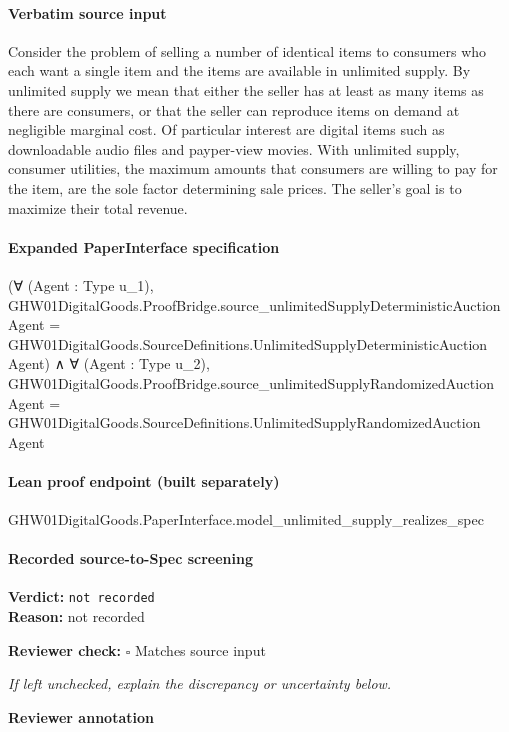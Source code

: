 \documentclass[10pt]{article}
\newcommand{\reviewerbox}{%
  \par\noindent\fbox{\parbox{0.96\linewidth}{\rule{0pt}{0.38in}}}\par
}
\newcommand{\reviewmatch}[1]{%
  \par\noindent\textbf{Reviewer check:} $\square$\; #1\par
  \noindent\emph{If left unchecked, explain the discrepancy or uncertainty below.}\par
}
\begin{document}
\paragraph{Verbatim source input}
\begin{ReviewVerbatim}
Consider the problem of selling a number of identical
items to consumers who each want a single item and
the items are available in unlimited supply. By unlimited supply we mean that either the seller has at
least as many items as there are consumers, or that
the seller can reproduce items on demand at negligible marginal cost. Of particular interest are digital items such as downloadable audio files and payper-view movies. With unlimited supply, consumer
utilities, the maximum amounts that consumers are
willing to pay for the item, are the sole factor determining sale prices. The seller’s goal is to maximize
their total revenue.
\end{ReviewVerbatim}


\paragraph{Expanded PaperInterface specification}
\begin{ReviewVerbatim}
(∀ (Agent : Type u_1),
    GHW01DigitalGoods.ProofBridge.source_unlimitedSupplyDeterministicAuction Agent =
      GHW01DigitalGoods.SourceDefinitions.UnlimitedSupplyDeterministicAuction Agent) ∧
  ∀ (Agent : Type u_2),
    GHW01DigitalGoods.ProofBridge.source_unlimitedSupplyRandomizedAuction Agent =
      GHW01DigitalGoods.SourceDefinitions.UnlimitedSupplyRandomizedAuction Agent
\end{ReviewVerbatim}

\paragraph{Lean proof endpoint (built separately)}\begin{ReviewVerbatim}
GHW01DigitalGoods.PaperInterface.model_unlimited_supply_realizes_spec
\end{ReviewVerbatim}

\paragraph{Recorded source-to-Spec screening}
\textbf{Verdict:} \texttt{not recorded}
\\
\textbf{Reason:} not recorded
\reviewmatch{Matches source input}
\noindent\textbf{Reviewer annotation}\par
\reviewerbox
\clearpage
\hypertarget{source-claim-c87f535bc9ad76c0}{}
\end{document}
